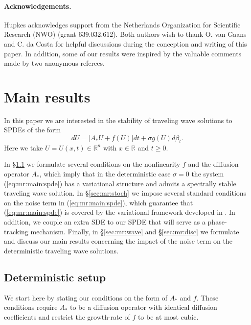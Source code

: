 \documentclass[10pt]{articleHJ}
\newcommand{\Real}{\mathbb{R}}							%
\newcommand{\sref}[1]{(\ref{#1})}                       %
\numberwithin{equation}{section}
\begin{document}
\paragraph{Acknowledgements.}
Hupkes acknowledges support from the Netherlands Organization
for Scientific Research (NWO) (grant 639.032.612).
Both authors wish to thank O. van Gaans and C. da Costa
for helpful discussions during the conception and writing of this paper. In addition, some of our results were inspired by the valuable comments made by two anonymous referees.






\section{Main results}
\label{sec:mr}

In this paper we are interested in the stability of traveling
wave solutions to SPDEs of the form
\begin{equation}
\label{eq:mr:main:spde}
dU =
  \big[ A_* U + f(U) \big] dt
  + \sigma g(U) d \beta_t.
\end{equation}
Here we take $U = U(x,t) \in \Real^n$ with $x \in \Real$ and $t \ge 0$.

In \S\ref{sec:mr:det} we formulate several
conditions on the nonlinearity $f$ and the diffusion operator $A_*$,
which imply that in the deterministic case $\sigma =0 $
the system \sref{eq:mr:main:spde}
has a variational structure
and admits a spectrally stable traveling wave solution.
In \S\ref{sec:mr:stoch} we impose several standard
conditions on the noise term in \sref{eq:mr:main:spde},
which guarantee that \sref{eq:mr:main:spde}
is covered by the variational framework developed in \cite{LiuRockner}.
In addition, we couple an extra SDE to our SPDE that will serve as a phase-tracking
mechanism.
Finally, in \S\ref{sec:mr:wave} and \S\ref{sec:mr:disc} we formulate
and discuss our main results
concerning the impact of the noise term on the deterministic traveling wave solutions.



\subsection{Deterministic setup}
\label{sec:mr:det}

We start here by stating our conditions on the form of $A_*$
and $f$. These conditions require $A_*$ to be a diffusion operator
with identical diffusion coefficients and
restrict the growth-rate of $f$ to be at most cubic.
\end{document}
